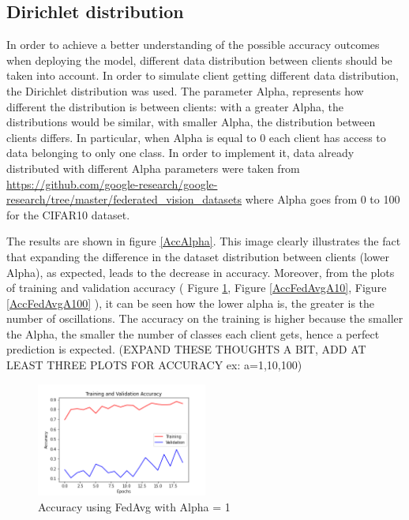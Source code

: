 \documentclass[twocolumn]{article}
\begin{document}
\subsection{Dirichlet distribution}

In order to achieve a better understanding of the possible accuracy outcomes when deploying the model, different data distribution between clients should be taken into account. In order to simulate client getting different data distribution, the Dirichlet distribution was used. The parameter Alpha, represents how different the distribution is between clients: with a greater Alpha, the distributions 
would be similar, with smaller Alpha, the distribution between clients differs.
In particular, when Alpha is equal to 0 each client has access to data belonging to only one class.
In order to implement it, data already distributed with different Alpha parameters were taken from \url{https://github.com/google-research/google-research/tree/master/federated_vision_datasets} where Alpha goes from 0 to 100 for the CIFAR10 dataset.



The results are shown in figure \ref{AccAlpha}. This image clearly illustrates the fact that expanding the difference in the dataset distribution between clients (lower Alpha), as expected, leads to the decrease in accuracy. 
Moreover, from the plots of training and validation accuracy ( Figure \ref{AccFedAvgA1}, Figure \ref{AccFedAvgA10}, Figure \ref{AccFedAvgA100} ), it can be seen how the lower alpha is, the greater is the number of oscillations.
The accuracy on the training is higher because the smaller the Alpha, the smaller the number of classes each client gets, hence a perfect prediction is expected. 
(EXPAND THESE THOUGHTS A BIT, ADD AT LEAST THREE PLOTS FOR ACCURACY ex: a=1,10,100)

\begin{figure}
    \centering
    \includegraphics[width=0.5\textwidth,height=.3\textheight]{2_AccuracyFedAvg_A1.png}
    \caption{Accuracy using FedAvg with Alpha = 1}
     \label{AccFedAvgA1} 
\end{figure}
\end{document}
